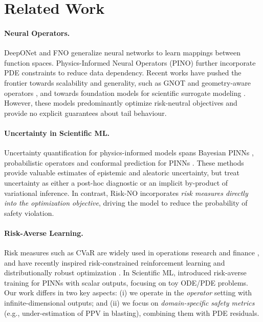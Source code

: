 \documentclass{article}
\theoremstyle{plain}
\theoremstyle{definition}
\theoremstyle{remark}
\begin{document}
\section{Related Work}
\label{sec:related}

\paragraph{Neural Operators.}
DeepONet \citep{lu2021learning} and FNO \citep{li2021fourier} generalize neural networks to learn mappings between function spaces. Physics-Informed Neural Operators (PINO) \citep{li2021physics} further incorporate PDE constraints to reduce data dependency. Recent works have pushed the frontier towards scalability and generality, such as GNOT \citep{hao2024gnot} and geometry-aware operators \citep{li2025geometry}, and towards foundation models for scientific surrogate modeling \citep{mccabe2024multiple,subramanian2025foundation}. However, these models predominantly optimize risk-neutral objectives and provide no explicit guarantees about tail behaviour.

\paragraph{Uncertainty in Scientific ML.}
Uncertainty quantification for physics-informed models spans Bayesian PINNs \citep{zhang2019quantifying,yang2021b}, probabilistic operators \citep{hoel2024probabilistic} and conformal prediction for PINNs \citep{teng2024conformal}. These methods provide valuable estimates of epistemic and aleatoric uncertainty, but treat uncertainty as either a post-hoc diagnostic or an implicit by-product of variational inference. In contrast, Risk-NO incorporates \emph{risk measures directly into the optimization objective}, driving the model to reduce the probability of safety violation.

\paragraph{Risk-Averse Learning.}
Risk measures such as CVaR are widely used in operations research and finance \citep{artzner1999coherent,rockafellar2000optimization}, and have recently inspired risk-constrained reinforcement learning \citep{chow2015risk} and distributionally robust optimization \citep{duchi2021learning}. In Scientific ML, \citet{liu2024risk} introduced risk-averse training for PINNs with scalar outputs, focusing on toy ODE/PDE problems. Our work differs in two key aspects: (i) we operate in the \emph{operator} setting with infinite-dimensional outputs; and (ii) we focus on \emph{domain-specific safety metrics} (e.g., under-estimation of PPV in blasting), combining them with PDE residuals.
\end{document}
